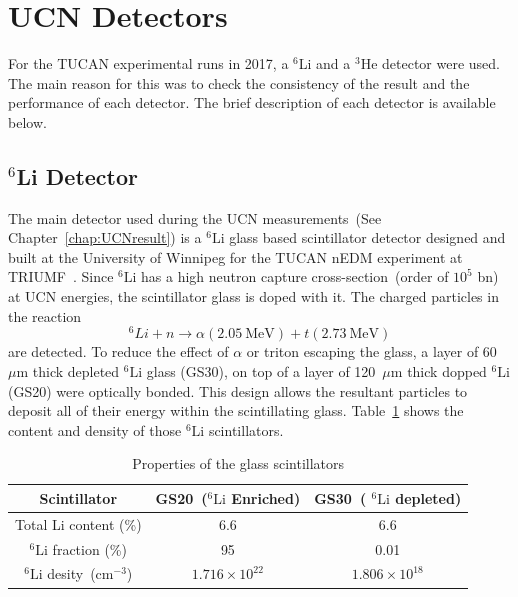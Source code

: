 \section{UCN Detectors\label{sec:detectors}}
For the TUCAN experimental runs in 2017, a $^6$Li and a $^3$He
detector were used. The main reason for this was to check the
consistency of the result and the performance of each detector. The
brief description of each detector is available below.

\subsection{$^6$Li Detector\label{sec:Li6detector}}
The main detector used during the UCN measurements~(See
Chapter~\ref{chap:UCNresult}) is a $^6\mathrm{Li}$ glass based scintillator
detector designed and built at the University of Winnipeg for the
TUCAN nEDM experiment at
TRIUMF~\cite{jamieson2017characterization}. Since $^6\mathrm{Li}$ has a high
neutron capture cross-section~(order of $10^5$ bn) at UCN energies,
the scintillator glass is doped with it. The charged particles in the
reaction
\begin{equation}
^6Li + n \rightarrow \alpha (2.05~\mathrm{MeV}) + t (2.73~\mathrm{MeV})
\end{equation}
are detected. To reduce the effect of $\alpha$ or triton escaping the
glass, a layer of 60~$\mu$m thick depleted $^6\mathrm{Li}$ glass (GS30), on top
of a layer of 120~$\mu$m thick dopped $^6\mathrm{Li}$ (GS20) were optically
bonded. This design allows the resultant particles to deposit all of
their energy within the scintillating
glass. Table~\ref{tab:scintillator} shows the content and density of
those $^6\mathrm{Li}$ scintillators.

\begin{table}[h!]
  \centering
  \label{tab:scintillator}
  \begin{tabular}{|c|c|c|}
    \hline
    Scintillator & GS20~($^6\mathrm{Li}$ Enriched) & GS30~( $^6\mathrm{Li}$ depleted) \\
    \hline
    Total Li content (\%) & 6.6 & 6.6 \\
    \hline
    $^6\mathrm{Li}$ fraction (\%) & 95 & 0.01 \\
    \hline
    $^6\mathrm{Li}$ desity~(cm$^{-3}$) & $1.716 \times 10^{22}$ & $1.806 \times 10^{18}$ \\
    \hline
  \end{tabular}
  \caption{Properties of the glass scintillators}
\end{table}


